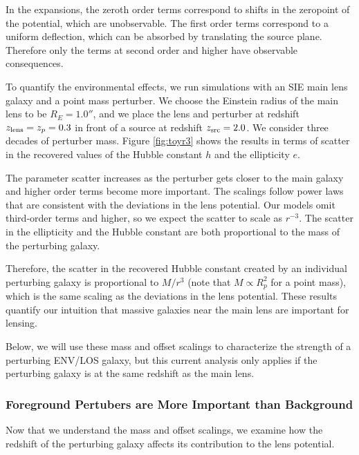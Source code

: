 \documentclass{emulateapj}
\begin{document}
In the expansions, the zeroth order terms correspond to shifts in the zeropoint of the potential, which are unobservable.  The first order terms correspond to a uniform deflection, which can be absorbed by translating the source plane.  Therefore only the terms at second order and higher have observable consequences.

To quantify the environmental effects, we run simulations with an SIE main lens galaxy and a point mass perturber.  We choose the Einstein radius of the main lens to be $R_E = 1.0''$, and we place the lens and perturber at redshift $z_{\rm{lens}} = z_p = 0.3$ in front of a source at redshift $z_{\rm{src}} = 2.0$.  We consider three decades of perturber mass.  Figure \ref{fig:toyr3} shows the results in terms of scatter in the recovered values of the Hubble constant $h$ and the ellipticity $e$.

The parameter scatter increases as the perturber gets closer to the main galaxy and higher order terms become more important.  The scalings follow power laws that are consistent with the deviations in the lens potential. Our models omit third-order terms and higher, so we expect the scatter to scale as $r^{-3}$. The scatter in the ellipticity and the Hubble constant are both proportional to the mass of the perturbing galaxy. 

Therefore, the scatter in the recovered Hubble constant created by an individual perturbing galaxy is proportional to $M / r^3$ (note that $ M \propto R_p^2$ for a point mass), which is the same scaling as the deviations in the lens potential. These results quantify our intuition that massive galaxies near the main lens are important for lensing. 

Below, we will use these mass and offset scalings to characterize the strength of a perturbing ENV/LOS galaxy, but this current analysis only applies if the perturbing galaxy is at the same redshift as the main lens.

\subsubsection{Foreground Pertubers are More Important than Background}
\label{sec:frontback}

Now that we understand the mass and offset scalings, we examine how the redshift of the perturbing galaxy affects its contribution to the lens potential. 
\end{document}
